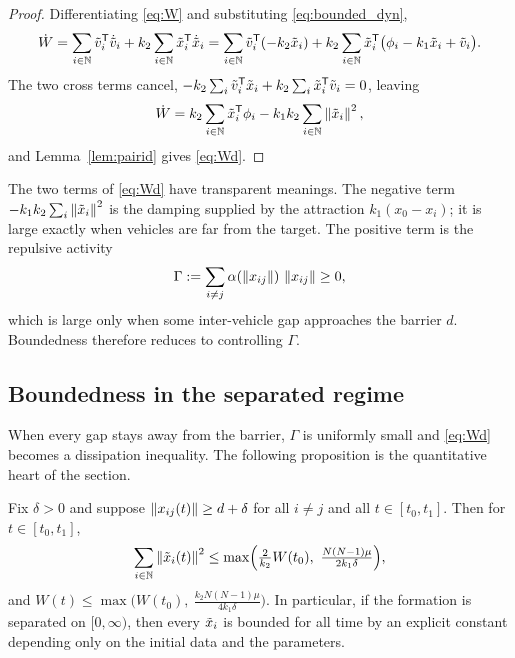 \begin{proof}
Differentiating \eqref{eq:W} and substituting \eqref{eq:bounded_dyn},
\begin{equation}
  \dot W
  =\sum_{i\in\mathbb{N}}\tilde{v}_i^{\mathsf T}\dot{\tilde{v}}_i+k_2\sum_{i\in\mathbb{N}}\tilde{x}_i^{\mathsf T}\dot{\tilde{x}}_i
  =\sum_{i\in\mathbb{N}}\tilde{v}_i^{\mathsf T}(-k_2\tilde{x}_i)
   +k_2\sum_{i\in\mathbb{N}}\tilde{x}_i^{\mathsf T}\bigl(\phi_i-k_1\tilde{x}_i+\tilde{v}_i\bigr) .
\end{equation}
The two cross terms cancel, $-k_2\sum_i\tilde{v}_i^{\mathsf T}\tilde{x}_i+k_2\sum_i\tilde{x}_i^{\mathsf T}\tilde{v}_i=0$,
leaving
\begin{equation}
  \dot W=k_2\sum_{i\in\mathbb{N}}\tilde{x}_i^{\mathsf T}\phi_i-k_1k_2\sum_{i\in\mathbb{N}}\left\| \tilde{x}_i \right\|^2 ,
\end{equation}
and Lemma~\ref{lem:pairid} gives \eqref{eq:Wd}.
\end{proof}

The two terms of \eqref{eq:Wd} have transparent meanings. The negative term $-k_1k_2\sum_i\left\| \tilde{x}_i \right\|^2$
is the damping supplied by the attraction $k_1(x_0-x_i)$; it is large exactly when vehicles are far
from the target. The positive term is the repulsive activity
\begin{equation}
  \Gamma:=\sum_{i\ne j}\alpha(\left\| x_{ij} \right\|)\,\left\| x_{ij} \right\|\ge0 ,
  \label{eq:Gamma}
\end{equation}
which is large only when some inter-vehicle gap approaches the barrier $d$. Boundedness therefore
reduces to controlling $\Gamma$.

\subsection{Boundedness in the separated regime}
\label{sec:separated}

When every gap stays away from the barrier, $\Gamma$ is uniformly small and \eqref{eq:Wd} becomes a
dissipation inequality. The following proposition is the quantitative heart of the section.

\begin{proposition}\label{prop:separated}
Fix $\delta>0$ and suppose $\left\| x_{ij}(t) \right\|\ge d+\delta$ for all $i\ne j$ and all
$t\in[t_0,t_1]$. Then for $t\in[t_0,t_1]$,
\begin{equation}
  \sum_{i\in\NN}\norm{\txi_i(t)}^2
  \le \max\Bigl(\tfrac{2}{k_2}W(t_0),\ \tfrac{N(N-1)\mu}{2k_1\delta}\Bigr) ,
  \label{eq:sepbound}
\end{equation}
and $W(t)\le\max\bigl(W(t_0),\ \tfrac{k_2 N(N-1)\mu}{4k_1\delta}\bigr)$. In particular, if the
formation is separated on $[0,\infty)$, then every $\tilde{x}_i$ is bounded for all time by an explicit
constant depending only on the initial data and the parameters.
\end{proposition}

